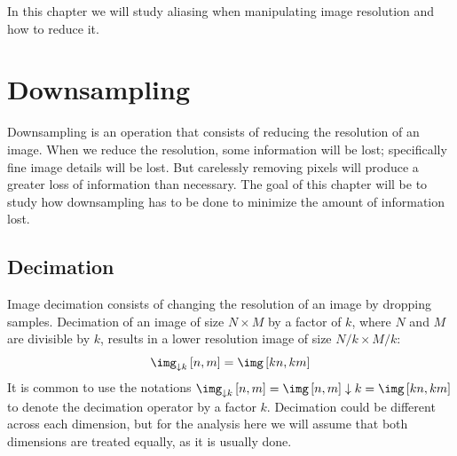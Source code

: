 In this chapter we will study aliasing when manipulating image resolution and how to reduce it. 


\section{Downsampling}

Downsampling is an operation that consists of reducing the resolution of an image. When we reduce the resolution, some information will be lost; specifically fine image details will be lost. But carelessly removing pixels will produce a greater loss of information than necessary. The goal of this chapter will be to study how downsampling has to be done to minimize the amount of information lost.  


\subsection{Decimation}

Image decimation consists of changing the resolution of an image by dropping samples. Decimation of an image of size $N \times M$ by a factor of $k$, where $N$ and $M$ are divisible by $k$, results in a lower resolution image of size $N/k \times M/k$: 
\begin{equation}
\img_{\downarrow k} \left[n,m\right]  = \img \left[kn, km\right]
\end{equation}
It is common to use the notations $\img_{\downarrow k} \left[n,m\right]   = \img \left[n,m\right] \downarrow k = \img \left[kn,km\right]$ to denote the decimation operator by a factor $k$. Decimation could be different across each dimension, but for the analysis here we will assume that both dimensions are treated equally, as it is usually done. 



